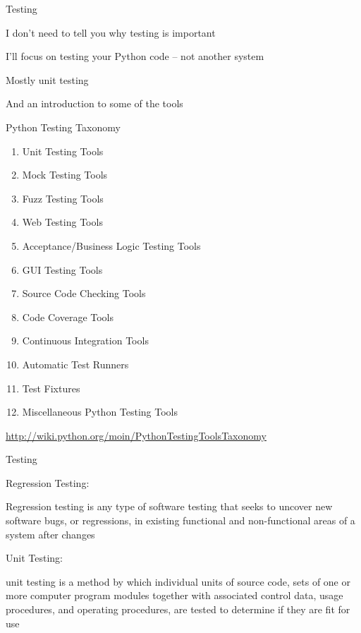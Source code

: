 \documentclass{beamer}
\begin{document}
\begin{frame}[fragile]{Testing}

\vfill
{\Large I don't need to tell you why testing is important}

\vfill
{\Large I'll focus on testing your Python code -- not another system}

\vfill
{\Large Mostly unit testing}

\vfill
{\Large And an introduction to some of the tools}

\vfill

\end{frame} 

\begin{frame}[fragile]{Python Testing Taxonomy}

\begin{enumerate}
  \item   Unit Testing Tools
  \item    Mock Testing Tools
  \item    Fuzz Testing Tools
  \item    Web Testing Tools
  \item    Acceptance/Business Logic Testing Tools
  \item    GUI Testing Tools
  \item    Source Code Checking Tools
  \item    Code Coverage Tools
  \item    Continuous Integration Tools
  \item    Automatic Test Runners
  \item    Test Fixtures
  \item    Miscellaneous Python Testing Tools
\end{enumerate}

\vfill
\url{http://wiki.python.org/moin/PythonTestingToolsTaxonomy}

\end{frame} 


\begin{frame}[fragile]{Testing}

\vfill
{\LARGE Regression Testing:}

\vfill
{\Large Regression testing is any type of software testing that seeks to
uncover new software bugs, or regressions, in existing functional and
non-functional areas of a system after changes}

\vfill
{\LARGE Unit Testing:}

\vfill
{\Large unit testing is a method by which individual units of source code,
sets of one or more computer program modules together with associated control
data, usage procedures, and operating procedures, are tested to determine if
they are fit for use}

\vfill

\end{frame} 
\end{document}
